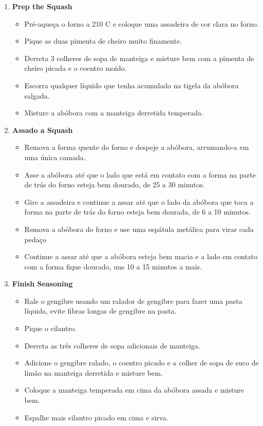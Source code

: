 \documentclass [11pt, letterpaper] {article}
\begin{document}
\begin {description}
\begin {enumerate}
\item {\bf Prep the Squash}
\begin {itemize}
\item Pré-aqueça o forno a 210 C e coloque uma assadeira de cor clara no forno.
\item Pique as duas pimenta de cheiro muito finamente.
\item Derreta 3 colheres de sopa de manteiga e misture bem com a pimenta de cheiro picada e o coentro moído.
\item Escorra qualquer líquido que tenha acumulado na tigela da abóbora salgada.
\item Misture a abóbora com a manteiga derretida temperada.
\end {itemize}

\item {\bf Assado a Squash}
\begin {itemize}
\item Remova a forma quente do forno e despeje a abóbora, arrumando-a em uma única camada.
\item Asse a abóbora até que o lado que est\'a em contato com a forma na parte de tr\'as do forno esteja bem dourado, de 25 a 30 minutos.
\item Gire a assadeira e continue a assar até que o lado da abóbora que toca a forma na parte de tr\'as do forno esteja bem dourada, de 6 a 10 minutos.
\item Remova a abóbora do forno e use uma espátula metálica para virar cada peda\c{c}o
\item Continue a assar até que a abóbora esteja bem macia e a lado em contato com a forma fique dourado, uns 10 a 15 minutos a mais.
\end {itemize}

\item {\bf Finish Seasoning}
\begin {itemize}
\item Rale o gengibre usando um ralador de gengibre para fazer uma pasta líquida, evite fibras longas de gengibre na pasta.
\item Pique o cilantro.
\item Derreta as três colheres de sopa adicionais de manteiga.
\item Adicione o gengibre ralado, o coentro picado e a colher de sopa de suco de limão na manteiga derretida e misture bem.
\item Coloque a manteiga temperada em cima da abóbora assada e misture bem.
\item Espalhe mais cilantro picado em cima e sirva.
\end {itemize}
\end {enumerate}
\end {description}
\end{document}
